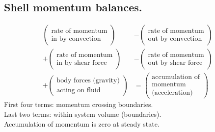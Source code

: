 \subsection{Shell momentum balances.}
\begin{align*}
	\begin{pmatrix}\text{rate of momentum} \\ \text{in by convection}\end{pmatrix}
	&-\begin{pmatrix}\text{rate of momentum} \\ \text{out by convection}\end{pmatrix}\\
	+\begin{pmatrix}\text{rate of momentum} \\ \text{in by shear force}\end{pmatrix}
	&-\begin{pmatrix}\text{rate of momentum} \\ \text{out by shear force}\end{pmatrix}\\
	+\begin{pmatrix}\text{body forces (gravity)} \\ \text{acting on fluid}\end{pmatrix}
	&=\begin{pmatrix}\text{accumulation of} \\ \text{momentum} \\ \text{(acceleration)}\end{pmatrix}
\end{align*}
First four terms: momentum crossing boundaries.\\
Last two terms: within system volume (boundaries).\\
Accumulation of momentum is zero at steady state.


